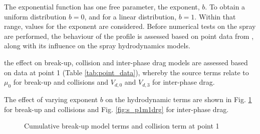 \documentclass[a4paper,10pt]{article}
\begin{document}
The exponential function has one free parameter, the exponent, $b$. To obtain a uniform distribution $b=0$, and for a linear distribution, $b=1$. Within that range, values for the exponent are considered. Before numerical tests on the spray are performed, 
the behaviour of the profile is assessed based on point data from \cite{jones2011}, along with its influence on the spray hydrodynamics models.

the effect on break-up, collision and inter-phase drag models are assessed based on data at point 1 (Table \ref{tab:point_data}), whereby the source terms relate to $\mu_0$ for break-up and collisions and $V_{d,0}$ and $V_{d,3}$ for inter-phase drag.

The effect of varying exponent $b$ on the hydrodynamic terms are shown in Fig. \ref{fig:s_p1m1} for break-up and collisions and Fig. \ref{fig:s_p1m1drg} for inter-phase drag.

\begin{figure}[H]
\centering
{}
\caption{Cumulative break-up model terms and collision term at point 1}
\label{fig:s_p1m1}
\end{figure}
\end{document}
